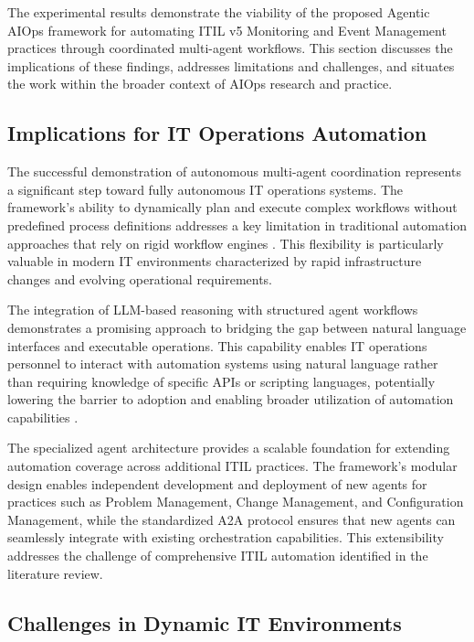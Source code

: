 \documentclass{article}
\begin{document}
The experimental results demonstrate the viability of the proposed Agentic AIOps framework for automating ITIL v5 Monitoring and Event Management practices through coordinated multi-agent workflows. This section discusses the implications of these findings, addresses limitations and challenges, and situates the work within the broader context of AIOps research and practice.

\subsection{Implications for IT Operations Automation}

The successful demonstration of autonomous multi-agent coordination represents a significant step toward fully autonomous IT operations systems. The framework's ability to dynamically plan and execute complex workflows without predefined process definitions addresses a key limitation in traditional automation approaches that rely on rigid workflow engines \cite{eramo2024}. This flexibility is particularly valuable in modern IT environments characterized by rapid infrastructure changes and evolving operational requirements.

The integration of LLM-based reasoning with structured agent workflows demonstrates a promising approach to bridging the gap between natural language interfaces and executable operations. This capability enables IT operations personnel to interact with automation systems using natural language rather than requiring knowledge of specific APIs or scripting languages, potentially lowering the barrier to adoption and enabling broader utilization of automation capabilities \cite{liu2024}.

The specialized agent architecture provides a scalable foundation for extending automation coverage across additional ITIL practices. The framework's modular design enables independent development and deployment of new agents for practices such as Problem Management, Change Management, and Configuration Management, while the standardized A2A protocol ensures that new agents can seamlessly integrate with existing orchestration capabilities. This extensibility addresses the challenge of comprehensive ITIL automation identified in the literature review.

\subsection{Challenges in Dynamic IT Environments}
\end{document}
